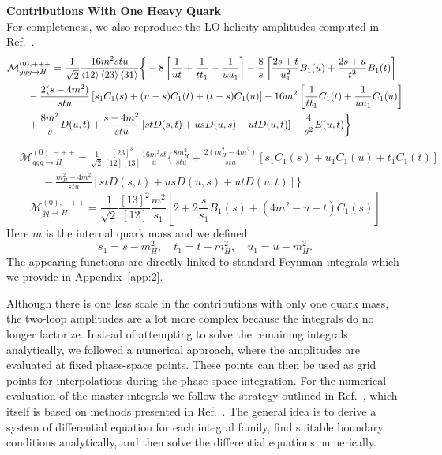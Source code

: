 \textbf{Contributions With One Heavy Quark} \\
For completeness, we also reproduce the \acs{LO} helicity amplitudes computed in Ref.~\cite{Baur:1989cm}.
\begin{equation}
\begin{split}
& \mathcal{M}_{ggg \rightarrow H}^{(0), +++} = \frac{1}{\sqrt{2}} \frac{16 m^2 stu}{\braket{12}\braket{23}\braket{31}} \bigg \lbrace - 8 \left[ \frac{1}{u t} + \frac{1}{t t_1} + \frac{1}{u u_1} \right] - \frac{8}{s} \left[ \frac{2 s + t}{u_1^2} B_1(u) + \frac{2 s + u}{t_1^2} B_1(t) \right] \\
& \qquad - \frac{2 (s - 4 m^2)}{stu} \left[ s_1 C_1(s) + (u - s) C_1(t) + (t - s) C_1(u) \right] - 16 m^2 \left[ \frac{1}{t t_1} C_1(t) + \frac{1}{u u_1} C_1(u) \right] \\
& \qquad + \frac{8 m^2}{s} D(u, t) + \frac{s - 4 m^2}{s t u} \left[ s t D(s, t) + u s D(u, s) - u t D(u, t) \right] - \frac{4}{s^2} E(u, t) \bigg \rbrace
\end{split}
\end{equation}
%
%
\begin{equation}
\begin{split}
& \mathcal{M}_{ggg \rightarrow H}^{(0), -++} = \frac{1}{\sqrt{2}} \frac{[23]^3}{[12][13]} \frac{16 m^2 s t}{u} \bigg \lbrace \frac{8 m_H^2}{s t u} + \frac{2 (m_H^2 - 4 m^2)}{stu} \left[ s_1 C_1(s) + u_1 C_1(u) + t_1 C_1(t) \right] \\
&\qquad - \frac{m_H^2 - 4 m^2}{stu} \left[ s t D(s, t) + u s D(u, s) + u t D(u, t) \right] \bigg \rbrace
\end{split}
\end{equation}
%
%
\begin{equation}
\mathcal{M}_{\bar{q} q \rightarrow H}^{(0), -++} = \frac{1}{\sqrt{2}} \frac{[13]^2}{[12]} \frac{m^2}{s_1} \left[ 2 + 2 \frac{s}{s_1} B_1(s) + \left(4 m^2 - u - t \right) C_1(s) \right]
\end{equation}
Here $m$ is the internal quark mass and we defined
\begin{equation}
s_1 = s - m_H^2, \quad t_1 = t - m_H^2, \quad u_1 = u - m_H^2.
\end{equation}
The appearing functions are directly linked to standard Feynman integrals which we provide in Appendix~\ref{app:2}.

Although there is one less scale in the contributions with only one quark mass, the two-loop amplitudes are a lot more complex because the integrals do no longer factorize. Instead of attempting to solve the remaining integrals analytically, we followed a numerical approach, where the amplitudes are evaluated at fixed phase-space points. These points can then be used as grid points for interpolations during the phase-space integration. For the numerical evaluation of the master integrals we follow the strategy outlined in Ref.~\cite{Czakon:2021yub}, which itself is based on methods presented in Ref.~\cite{Czakon:2015exa}. The general idea is to derive a system of differential equation for each integral family, find suitable boundary conditions analytically, and then solve the differential equations numerically.


